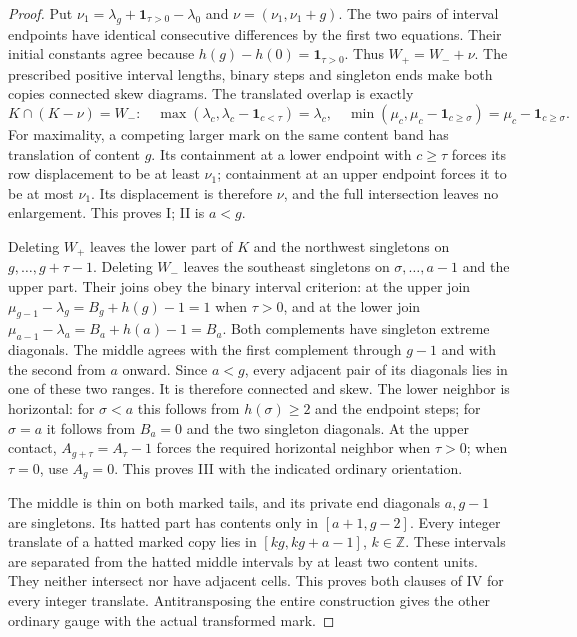 \documentclass[11pt,a4paper]{amsart}
\numberwithin{equation}{section}
\theoremstyle{plain}
\theoremstyle{definition}
\newcommand{\Z}{\mathbb Z}
\begin{document}
\begin{proof}
Put \(\nu_1=\lambda_g+\mathbf1_{\tau>0}-\lambda_0\) and
\(\nu=(\nu_1,\nu_1+g)\).  The two pairs of interval endpoints
have identical consecutive differences by the first two equations.
Their initial constants agree because \(h(g)-h(0)=\mathbf1_{\tau>0}\).
Thus \(W_+=W_-+\nu\).  The prescribed positive interval lengths,
binary steps and singleton ends make both copies connected skew diagrams.
The translated overlap is exactly
\[
 K\cap(K-\nu)=W_-:
 \quad \max(\lambda_c,\lambda_c-\mathbf1_{c<\tau})=\lambda_c,
 \quad \min(\mu_c,\mu_c-\mathbf1_{c\ge\sigma})
       =\mu_c-\mathbf1_{c\ge\sigma}.
\]
For maximality, a competing larger mark on the same content band has
translation of content \(g\).  Its containment at a lower endpoint with
\(c\ge\tau\) forces its row displacement to be at least \(\nu_1\);
containment at an upper endpoint forces it to be at most \(\nu_1\).
Its displacement is therefore \(\nu\), and the full intersection leaves
no enlargement.  This proves I; II is \(a<g\).

Deleting \(W_+\) leaves the lower part of \(K\) and the northwest
singletons on \(g,\ldots,g+\tau-1\).  Deleting \(W_-\) leaves
the southeast singletons on \(\sigma,\ldots,a-1\) and the upper
part.  Their joins obey the binary interval criterion: at the upper join
\(\mu_{g-1}-\lambda_g=B_g+h(g)-1=1\) when \(\tau>0\), and at
the lower join \(\mu_{a-1}-\lambda_a=B_a+h(a)-1=B_a\).
Both complements have singleton extreme diagonals.  The middle agrees
with the first complement through \(g-1\) and with the second from
\(a\) onward.  Since \(a<g\), every adjacent pair of its diagonals
lies in one of these two ranges.  It is therefore connected and skew.
The lower neighbor is horizontal: for \(\sigma<a\) this follows from
\(h(\sigma)\ge2\) and the endpoint steps; for \(\sigma=a\) it
follows from \(B_a=0\) and the two singleton diagonals.  At the upper
contact, \(A_{g+\tau}=A_\tau-1\) forces the required horizontal
neighbor when \(\tau>0\); when \(\tau=0\), use \(A_g=0\).
This proves III with the indicated ordinary orientation.

The middle is thin on both marked tails, and its private end diagonals
\(a,g-1\) are singletons.  Its hatted part has contents only in
\([a+1,g-2]\).  Every integer translate of a hatted marked copy lies
in \([kg,kg+a-1]\), \(k\in\Z\).  These intervals are separated
from the hatted middle intervals by at least two content units.  They
neither intersect nor have adjacent cells.  This proves both clauses of
IV for every integer translate.  Antitransposing the entire construction
gives the other ordinary gauge with the actual transformed mark.
\end{proof}
\end{document}
